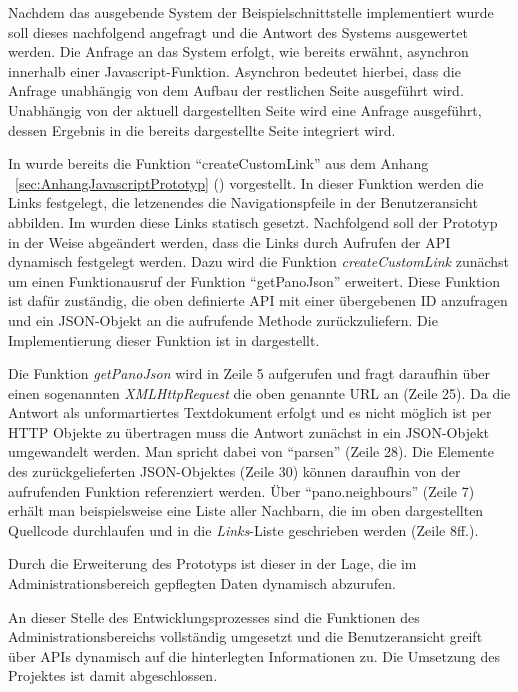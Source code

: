 Nachdem das ausgebende System der Beispielschnittstelle implementiert wurde
soll dieses nachfolgend angefragt und die Antwort des Systems ausgewertet
werden. Die Anfrage an das System erfolgt, wie bereits erwähnt, asynchron
innerhalb einer Javascript-Funktion. Asynchron bedeutet hierbei, dass die
Anfrage unabhängig von dem Aufbau der restlichen Seite ausgeführt wird.
Unabhängig von der aktuell dargestellten Seite wird eine Anfrage ausgeführt,
dessen Ergebnis in die bereits dargestellte Seite integriert wird.

In  wurde bereits die Funktion "`createCustomLink"' aus dem
Anhang ~\ref{sec:AnhangJavascriptPrototyp}
() vorgestellt. In dieser Funktion
werden die Links festgelegt, die letzenendes die Navigationspfeile in der
Benutzeransicht abbilden. Im  wurden diese Links statisch
gesetzt. Nachfolgend soll der Prototyp in der Weise abgeändert werden, dass die
Links durch Aufrufen der API dynamisch festgelegt werden. Dazu wird die Funktion
\textit{createCustomLink} zunächst um einen Funktionausruf der Funktion
"`getPanoJson"' erweitert. Diese Funktion ist dafür zuständig, die oben
definierte API mit einer übergebenen ID anzufragen und ein JSON-Objekt an die
aufrufende Methode zurückzuliefern. Die Implementierung dieser Funktion ist in
 dargestellt.



Die Funktion \textit{getPanoJson} wird in Zeile 5 aufgerufen und fragt daraufhin
über einen sogenannten \textit{XMLHttpRequest} die oben genannte URL an (Zeile
25). Da die Antwort als unformartiertes Textdokument erfolgt und es nicht
möglich ist per HTTP Objekte zu übertragen muss die Antwort zunächst in ein
JSON-Objekt umgewandelt werden. Man spricht dabei von "`parsen"' (Zeile 28). Die
Elemente des zurückgelieferten JSON-Objektes (Zeile 30) können daraufhin von der
aufrufenden Funktion referenziert werden. Über "`pano.neighbours"' (Zeile 7)
erhält man beispielsweise eine Liste aller Nachbarn, die im oben dargestellten
Quellcode durchlaufen und in die \textit{Links}-Liste geschrieben werden (Zeile
8ff.).

Durch die Erweiterung des Prototyps ist dieser in der Lage, die im
Administrationsbereich gepflegten Daten dynamisch abzurufen.

An dieser Stelle des Entwicklungsprozesses sind die Funktionen des
Administrationsbereichs vollständig umgesetzt und die Benutzeransicht greift
über APIs dynamisch auf die hinterlegten Informationen zu. Die Umsetzung des
Projektes ist damit abgeschlossen.